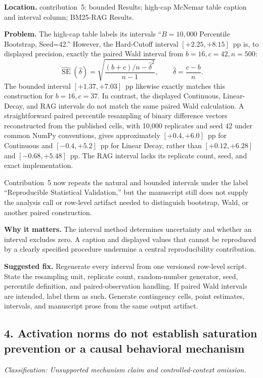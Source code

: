 \documentclass[11pt]{article}
\newcommand{\findinglabel}[1]{\textbf{#1}}
\newcommand{\classification}[1]{\textit{Classification: #1.}}
\begin{document}
\findinglabel{Location.} contribution~5; bounded Results; high-cap McNemar table caption and interval column; BM25-RAG Results.

\findinglabel{Problem.} The high-cap table labels its intervals ``$B=10{,}000$ Percentile Bootstrap, Seed=42.''  However, the Hard-Cutoff interval $[+2.25,+8.15]$~pp is, to displayed precision, exactly the paired Wald interval from $b=16,c=42,n=500$:
\[
\widehat{\operatorname{SE}}(\hat\delta)
=\sqrt{\frac{(b+c)/n-\hat\delta^2}{n-1}},
\qquad
\hat\delta=\frac{c-b}{n}.
\]
The bounded interval $[+1.37,+7.03]$~pp likewise exactly matches this construction for $b=16,c=37$.  In contrast, the displayed Continuous, Linear-Decay, and RAG intervals do not match the same paired Wald calculation.  A straightforward paired percentile resampling of binary difference vectors reconstructed from the published cells, with 10,000 replicates and seed 42 under common NumPy conventions, gives approximately $[+0.4,+6.0]$~pp for Continuous and $[-0.4,+5.2]$~pp for Linear Decay, rather than $[+0.12,+6.28]$ and $[-0.68,+5.48]$~pp.  The RAG interval lacks its replicate count, seed, and exact implementation.

Contribution~5 now repeats the natural and bounded intervals under the label ``Reproducible Statistical Validation,'' but the manuscript still does not supply the analysis call or row-level artifact needed to distinguish bootstrap, Wald, or another paired construction.

\findinglabel{Why it matters.} The interval method determines uncertainty and whether an interval excludes zero.  A caption and displayed values that cannot be reproduced by a clearly specified procedure undermine a central reproducibility contribution.

\findinglabel{Suggested fix.} Regenerate every interval from one versioned row-level script.  State the resampling unit, replicate count, random-number generator, seed, percentile definition, and paired-observation handling.  If paired Wald intervals are intended, label them as such.  Generate contingency cells, point estimates, intervals, and manuscript prose from the same output artifact.

\subsection*{4. Activation norms do not establish saturation prevention or a causal behavioral mechanism}

\classification{Unsupported mechanism claim and controlled-context omission}
\end{document}
